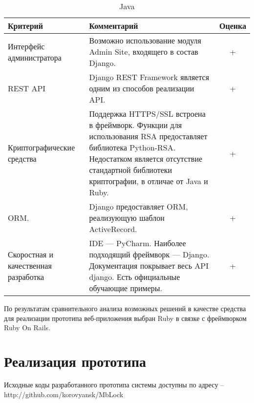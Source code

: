 \bgroup %
\def\arraystretch{1.5}%
  \begin{longtable}{| p{} | p{} | c |} 
  \caption{Java} %
  \hline
    Критерий & Комментарий & Оценка \\
  \hline
    Интерфейс администратора

    & Возможно использование модуля Admin Site, входящего в состав Django.

    & + \\
  \hline      
    REST API

    & Django REST Framework является одним из способов реализации API.

    & + \\
  \hline
    Криптографические средства

    & Поддержка HTTPS/SSL встроена в фреймворк. Функции для использования RSA предоставляет библиотека Python-RSA. Недостатком является отсутствие стандартной библиотеки криптографии, в отличае от Java и Ruby.

    & + \\
  \hline
    ORM.
    
    & Django предоставляет ORM, реализующую шаблон ActiveRecord.

    & + \\
  \hline
    Скоростная и качественная разработка
    
    & IDE — PyCharm. Наиболее подходящий фреймворк — Django. Документация покрывает весь API django. Есть официальные обучающие примеры.

    & + \\
  \hline

  \end{longtable}
\egroup %

По результатам сравнительного анализа возможных решений в качестве средства для реализации прототипа веб-приложения выбран Ruby в связке с фреймворком Ruby On Rails.

\pagebreak

\section{Реализация прототипа} \label{sect3_5}
Исходные коды разработанного прототипа системы доступны по адресу – http://github.com/korovyansk/MbLock

\clearpage